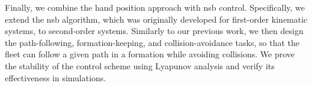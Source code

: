 Finally, we combine the hand position approach with \acrlong{nsb} control.
Specifically, we extend the \acrlong{nsb} algorithm, which was originally developed for first-order kinematic systems, to second-order systems.
Similarly to our previous work, we then design the path-following, formation-keeping, and collision-avoidance tasks, so that the fleet can follow a given path in a formation while avoiding collisions.
We prove the stability of the control scheme using Lyapunov analysis and verify its effectiveness in simulations. 
